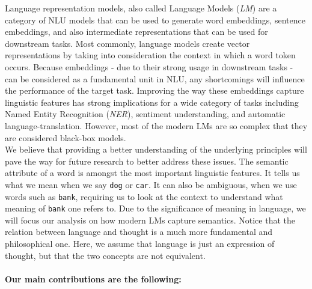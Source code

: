 \documentclass[a4paper,12pt,oneside,openright]{report}
\begin{document}
Language representation models, also called Language Models (\textit{LM}) are a category of NLU models that can be used to generate word embeddings, sentence embeddings, and also intermediate representations that can be used for downstream tasks.
Most commonly, language models create vector representations by taking into consideration the context in which a word token occurs. 
Because embeddings - due to their strong usage in downstream tasks - can be considered as a fundamental unit in NLU, any shortcomings will influence the performance of the target task.
Improving the way these embeddings capture linguistic features has strong implications for a wide category of tasks including Named Entity Recognition (\textit{NER}), sentiment understanding, and automatic language-translation. 
However, most of the modern LMs are so complex that they are considered black-box models.
\\

We believe that providing a better understanding of the underlying principles will pave the way for future research to better address these issues.
The semantic attribute of a word is amongst the most important linguistic features.
It tells us what we mean when we say \texttt{dog} or \texttt{car}.
It can also be ambiguous, when we use words such as \texttt{bank}, requiring us to look at the context to understand what meaning of \texttt{bank} one refers to.
Due to the significance of meaning in language, we will focus our analysis on how modern LMs capture semantics. 
Notice that the relation between language and thought is a much more fundamental and philosophical one.
Here, we assume that language is just an expression of thought, but that the two concepts are not equivalent.

\paragraph{Our main contributions are the following:}
\end{document}
